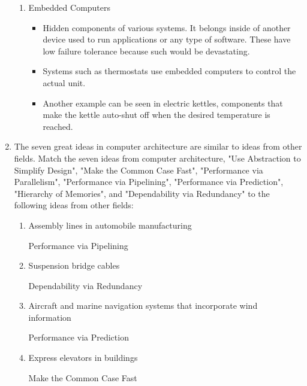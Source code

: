 \documentclass[10pt]{article}
\begin{document}
\begin{enumerate}
\begin{enumerate}
        \item Embedded Computers
        \begin{itemize}
            \item Hidden components of various systems. It belongs inside of another device
            used to run applications or any type of software. These have low failure tolerance
            because such would be devastating.
            \item Systems such as thermostats use embedded computers to control the actual
            unit.
            \item Another example can be seen in electric kettles, components that make
            the kettle auto-shut off when the desired temperature is reached.
        \end{itemize}
    \end{enumerate}
    \item The seven great ideas in computer architecture are similar to ideas from other fields. Match the seven ideas from computer architecture, "Use Abstraction to Simplify Design", "Make the Common Case Fast", "Performance via Parallelism", "Performance via Pipelining", "Performance via Prediction", "Hierarchy of Memories", and "Dependability via Redundancy" to the following ideas from other fields:
    \begin{enumerate}
        \item Assembly lines in automobile manufacturing
        \begin{description}
            \item[Performance via Pipelining] 
        \end{description}

        \item Suspension bridge cables
        \begin{description}
            \item[Dependability via Redundancy] 
        \end{description}

        \item Aircraft and marine navigation systems that incorporate wind information
        \begin{description}
            \item[Performance via Prediction] 
        \end{description}

        \item Express elevators in buildings
        \begin{description}
            \item[Make the Common Case Fast] 
        \end{description}


\end{enumerate}
\end{enumerate}
\end{document}

